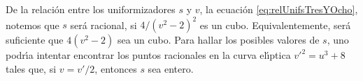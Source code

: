 \begin{obsSerre}\label{thm:obsSerre}
De la relaci\'{o}n entre los uniformizadores $s$ y $v$,
la ecuaci\'{o}n \ref{eq:relUnifsTresYOcho},
notemos que $s$ ser\'{a} racional, si $4/(v^{2}-2)^{2}$ es un cubo.
Equivalentemente, ser\'{a} suficiente que $4(v^{2}-2)$ sea un cubo. Para hallar
los posibles valores de $s$, uno podr\'{\i}a intentar encontrar los puntos
racionales en la curva el\'{\i}ptica $v'^{2}=u^{3}+8$ tales que, si $v=v'/2$,
entonces $s$ sea entero.
\end{obsSerre}

%